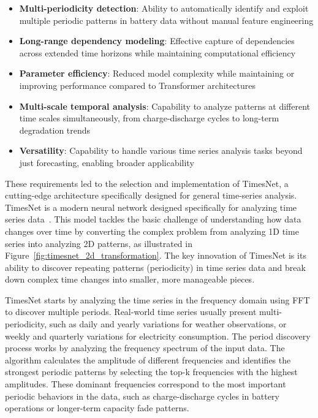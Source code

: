 \begin{itemize}
    \item \textbf{Multi-periodicity detection}: Ability to automatically identify and exploit multiple periodic patterns in battery data without manual feature engineering
    \item \textbf{Long-range dependency modeling}: Effective capture of dependencies across extended time horizons while maintaining computational efficiency
    \item \textbf{Parameter efficiency}: Reduced model complexity while maintaining or improving performance compared to Transformer architectures
    \item \textbf{Multi-scale temporal analysis}: Capability to analyze patterns at different time scales simultaneously, from charge-discharge cycles to long-term degradation trends
    \item \textbf{Versatility}: Capability to handle various time series analysis tasks beyond just forecasting, enabling broader applicability
\end{itemize}

These requirements led to the selection and implementation of TimesNet, a cutting-edge architecture specifically designed for general time-series analysis. TimesNet is a modern neural network designed specifically for analyzing time series data~\cite{wu_timesnet_2023}. This model tackles the basic challenge of understanding how data changes over time by converting the complex problem from analyzing 1D time series into analyzing 2D patterns, as illustrated in Figure~\ref{fig:timesnet_2d_transformation}. The key innovation of TimesNet is its ability to discover repeating patterns (periodicity) in time series data and break down complex time changes into smaller, more manageable pieces.


TimesNet starts by analyzing the time series in the frequency domain using FFT to discover multiple periods. Real-world time series usually present multi-periodicity, such as daily and yearly variations for weather observations, or weekly and quarterly variations for electricity consumption. The period discovery process works by analyzing the frequency spectrum of the input data. The algorithm calculates the amplitude of different frequencies and identifies the strongest periodic patterns by selecting the top-k frequencies with the highest amplitudes. These dominant frequencies correspond to the most important periodic behaviors in the data, such as charge-discharge cycles in battery operations or longer-term capacity fade patterns.



